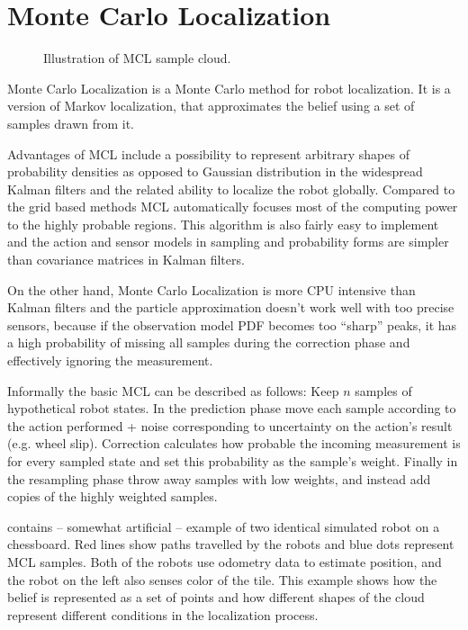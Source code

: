 \section{Monte Carlo Localization}
\label{sec:mcl-algorithm}

\begin{figure}[tp]
	\centering
	
	\caption{Illustration of MCL sample cloud.}
	\label{fig:mcl}
\end{figure}

Monte Carlo Localization \cite{dellaert99} is a Monte Carlo method for
robot localization.
It is a version of Markov localization, that approximates the belief
using a set of samples drawn from it.

Advantages of MCL include a
possibility to represent arbitrary shapes of probability densities as opposed to
Gaussian distribution in the widespread Kalman filters
and the related ability to localize the robot globally.
Compared to the grid based methods MCL automatically focuses most of the
computing power to the highly probable regions.
This algorithm is also fairly easy to implement and the action and sensor models
in sampling and probability forms are simpler than covariance matrices in
Kalman filters.

On the other hand, Monte Carlo Localization is more CPU intensive than Kalman filters
and the particle approximation doesn't work well with too precise sensors,
because if the observation model PDF becomes too \enquote{sharp} peaks, it has a high probability
of missing all samples during the correction phase and effectively ignoring the measurement.

Informally the basic MCL can be described as follows:
Keep \(n\) samples of hypothetical robot states.
In the prediction phase move each sample according to the action performed + noise corresponding
to uncertainty on the action's result (e.g. wheel slip).
Correction calculates how probable the incoming measurement is
for every sampled state and set this probability as the sample's weight.
Finally in the resampling phase throw away samples with low weights, and
instead add copies of the highly weighted samples.

 contains -- somewhat artificial -- example of two
identical simulated robot on a chessboard.
Red lines show paths travelled by the robots and blue dots represent MCL samples.
Both of the robots use odometry data to estimate position, and the robot on the left
also senses color of the tile.
This example shows how the belief is represented as a set of points and how
different shapes of the cloud represent different conditions in the localization
process.

